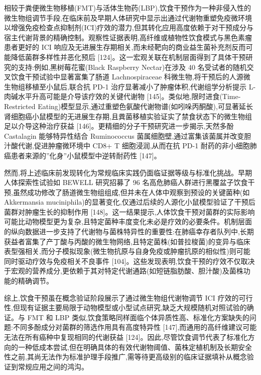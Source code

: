 相较于粪便微生物移植(FMT)与活体生物药(LBP),饮食干预作为一种非侵入性的微生物组调节手段,在临床前及早期人体研究中显示出通过代谢物重塑免疫微环境以增强免疫检查点抑制剂(ICI)疗效的潜力,但其转化应用高度依赖于对干预成分与宿主代谢背景的精确控制。观察性证据表明,高纤维或植物性饮食模式与黑色素瘤患者更好的 ICI 响应及无进展生存期相关,而未经靶向的商业益生菌补充剂反而可能降低菌群多样性并恶化预后 {[}124{]}。这一宏观关联在机制层面得到了具体干预研究的支持:例如,黑树莓花蜜(Black Raspberry Nectar)在涉及 40 名受试者的随机交叉饮食干预试验中显著富集了肠道 Lachnospiraceae 科微生物,将干预后的人源微生物组移植至小鼠后,联合抗 PD-1 治疗显著减小了肿瘤体积,代谢组学分析提示 L-肉碱水平升高可能是介导该疗效的关键代谢物 {[}145{]}。类似地,限时进食(Time-Restricted Eating)模型显示,通过重塑色氨酸代谢物谱(如吲哚丙酮酸),可显著延长肾细胞癌小鼠模型的无进展生存期,且粪菌移植实验证实了禁食状态下的微生物组足以介导这种治疗获益 {[}146{]}。更精细的分子干预研究进一步揭示,天然多酚 Castalagin 能够特异性结合 Ruminococcus 菌属细胞壁,通过富集该菌属并改变胆汁酸代谢,促进肿瘤微环境中 CD8+ T 细胞浸润,从而在抗 PD-1 耐药的非小细胞肺癌患者来源的''化身''小鼠模型中逆转耐药性 {[}147{]}。

然而,将上述临床前发现转化为常规临床实践仍面临证据等级与标准化挑战。早期人体探索性试验如 BEWELL 研究招募了 96 名高危肺癌人群进行黑覆盆子饮食干预,虽然成功修改了肠道微生物组组成,但并未在人体中观察到预设的关键菌种(如 Akkermansia muciniphila)的显著变化,仅通过后续的人源化小鼠模型验证了干预后菌群对肿瘤生长的抑制作用 {[}148{]}。这一结果提示,人体饮食干预对菌群的实际影响可能比动物模型更为复杂,且特定菌种丰度变化未必是疗效的必要条件。机制层面的纵向数据进一步支持了代谢物与菌株特异性的重要性:在肺癌幸存者队列中,长期获益者富集了产丁酸与丙酸的微生物网络,且特定菌株(如普拉梭菌)的变异与临床表型强相关,而分子模拟现象(微生物抗原与自身免疫或肿瘤抗原的相似性)则可能同时驱动疗效与免疫相关不良事件 {[}104{]}。这些发现表明,饮食干预的疗效不仅取决于宏观的营养成分,更依赖于其对特定代谢通路(如短链脂肪酸、胆汁酸)及菌株功能的精确调节。

综上,饮食干预虽在概念验证阶段展示了通过微生物组代谢物调节 ICI 疗效的可行性,但现有证据主要局限于动物模型或小型试点研究,缺乏大规模随机对照试验的确证。与 FMT 和 LBP 类似,饮食策略同样面临个体异质性高、标准化方案缺失的问题:不同多酚成分对菌群的筛选作用具有高度特异性 {[}147{]},而通用的高纤维建议可能无法在所有癌种中复现相同的代谢获益 {[}124{]}。因此,尽管饮食调节代表了标准化方向的一种低成本尝试,但在明确具体的有效代谢物阈值、菌株定植机制及长期安全性之前,其尚无法作为标准护理手段推广,需等待更高级别的临床证据填补从概念验证到常规应用之间的鸿沟。

